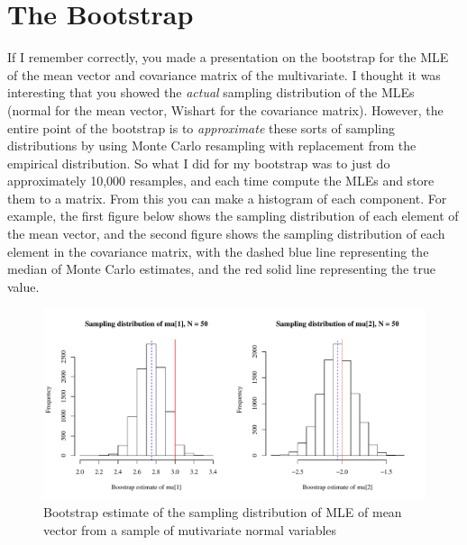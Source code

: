 \documentclass[11pt]{article}
\begin{document}
\section{The Bootstrap}

If I remember correctly, you made a presentation on the bootstrap for the MLE of the mean vector and covariance matrix of the multivariate. I thought it was interesting that you showed the \emph{actual} sampling distribution of the MLEs (normal for the mean vector, Wishart for the covariance matrix). However, the entire point of the bootstrap is to \emph{approximate} these sorts of sampling distributions by using Monte Carlo resampling with replacement from the empirical distribution. So what I did for my bootstrap was to just do approximately 10,000 resamples, and each time compute the MLEs and store them to a matrix. From this you can make a histogram of each component. For example, the first figure below shows the sampling distribution of each element of the mean vector, and the second figure shows the sampling distribution of each element in the covariance matrix, with the dashed blue line representing the median of Monte Carlo estimates, and the red solid line representing the true value. 
\pagebreak

\begin{figure}[htp!]
	\centering
		\includegraphics[scale=0.6]{mu.pdf}
	\caption{Bootstrap estimate of the sampling distribution of MLE of mean vector from a sample of mutivariate normal variables}
\end{figure}

\pagebreak
\end{document}
